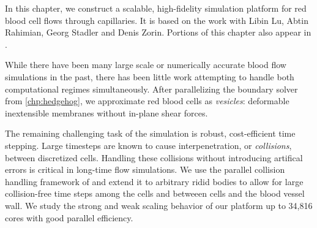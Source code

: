 In this chapter, we construct a scalable, high-fidelity simulation platform for red blood cell flows through capillaries.
It is based on the work \cite{lu2019scalable} with Libin Lu, Abtin Rahimian, Georg Stadler and Denis Zorin.
Portions of this chapter also appear in \cite{lu2019parallel}.

While there have been many large scale or numerically accurate blood flow simulations in the past, there has been little work attempting to handle both computational regimes simultaneously.
After parallelizing the boundary solver from \cref{chp:hedgehog}, we approximate red blood cells as \textit{vesicles}: deformable inextensible membranes without in-plane shear forces.

The remaining challenging task of the simulation is robust, cost-efficient time stepping.
Large timesteps are known to cause interpenetration, or \textit{collisions}, between discretized cells.
Handling these collisions without introducing artifical errors is critical in long-time flow simulations.
We use the parallel collision handling framework of  and extend it to arbitrary ridid bodies to allow for large collision-free time steps among the cells and betweeen cells and the blood vessel wall.
We study the strong and weak scaling behavior of our platform up to 34,816 cores with good parallel efficiency.







